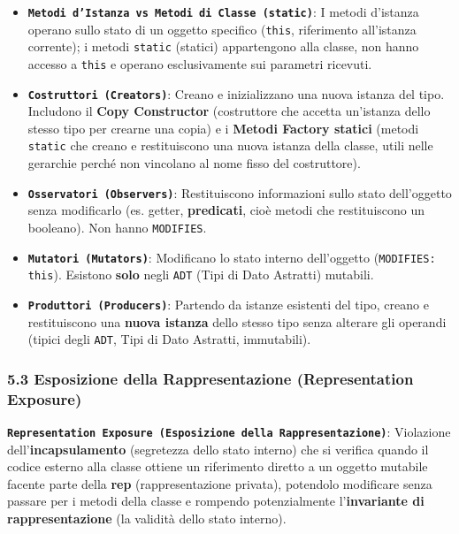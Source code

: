 \begin{itemize}

\item \textbf{\texttt{Metodi d'Istanza vs Metodi di Classe (static)}}: I metodi d'istanza operano sullo stato di un oggetto specifico (\texttt{this}, riferimento all'istanza corrente); i metodi \texttt{static} (statici) appartengono alla classe, non hanno accesso a \texttt{this} e operano esclusivamente sui parametri ricevuti.



\item \textbf{\texttt{Costruttori (Creators)}}: Creano e inizializzano una nuova istanza del tipo. Includono il \textbf{Copy Constructor} (costruttore che accetta un'istanza dello stesso tipo per crearne una copia) e i \textbf{Metodi Factory statici} (metodi \texttt{static} che creano e restituiscono una nuova istanza della classe, utili nelle gerarchie perché non vincolano al nome fisso del costruttore).



\item \textbf{\texttt{Osservatori (Observers)}}: Restituiscono informazioni sullo stato dell'oggetto senza modificarlo (es. getter, \textbf{predicati}, cioè metodi che restituiscono un booleano). Non hanno \texttt{MODIFIES}.



\item \textbf{\texttt{Mutatori (Mutators)}}: Modificano lo stato interno dell'oggetto (\texttt{MODIFIES: this}). Esistono \textbf{solo} negli \texttt{ADT} (Tipi di Dato Astratti) mutabili.



\item \textbf{\texttt{Produttori (Producers)}}: Partendo da istanze esistenti del tipo, creano e restituiscono una \textbf{nuova istanza} dello stesso tipo senza alterare gli operandi (tipici degli \texttt{ADT}, Tipi di Dato Astratti, immutabili).

\end{itemize}

\subsubsection{5.3 Esposizione della Rappresentazione (Representation Exposure)}\label{5-3-esposizione-della-rappresentazione-representation-exposure}

\textbf{\texttt{Representation Exposure (Esposizione della Rappresentazione)}}: Violazione dell'\textbf{incapsulamento} (segretezza dello stato interno) che si verifica quando il codice esterno alla classe ottiene un riferimento diretto a un oggetto mutabile facente parte della \textbf{rep} (rappresentazione privata), potendolo modificare senza passare per i metodi della classe e rompendo potenzialmente l'\textbf{invariante di rappresentazione} (la validità dello stato interno).

